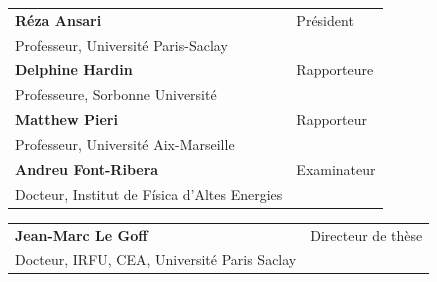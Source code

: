 \begin{titlepage}
\scriptsize
\begin{tabular}{|p{12cm}l}
\arrayrulecolor{Prune}
\textbf{Réza Ansari} &   Président\\ 
Professeur, Université Paris-Saclay & \\
\textbf{Delphine Hardin} &  Rapporteure \\ 
Professeure, Sorbonne Université   &   \\ 
\textbf{Matthew Pieri} &  Rapporteur \\ 
Professeur, Université Aix-Marseille  &   \\ 
\textbf{Andreu Font-Ribera} &  Examinateur \\ 
Docteur, Institut de Física d’Altes Energies   &   \\ 

\end{tabular} 



\medskip
\begin{tabular}{p{12cm}l}\arrayrulecolor{white}
  \textbf{Jean-Marc Le Goff} &  Directeur de thèse \\ 
  Docteur, IRFU, CEA, Université Paris Saclay   &   \\ 



\end{tabular} 


\end{titlepage}